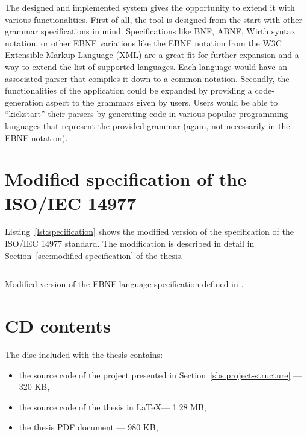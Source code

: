 \documentclass[english,bachelors,forcepolishlogotype]{wizthesis}
\begin{document}
The designed and implemented system gives the opportunity to extend it with
various functionalities. First of all, the tool is designed from the start with
other grammar specifications in mind. Specifications like BNF, ABNF, Wirth
syntax notation, or other EBNF variations like the EBNF notation from the W3C
Extensible Markup Language (XML) are a great fit for further expansion and a way
to extend the list of supported languages. Each language would have an
associated parser that compiles it down to a common notation. Secondly, the
functionalities of the application could be expanded by providing a
code-generation aspect to the grammars given by users. Users would be able to
``kickstart'' their parsers by generating code in various popular programming
languages that represent the provided grammar (again, not necessarily in the
EBNF notation).



\listoffigures

\listoftables

\listoflistings

\begin{appendices}

\chapter{Modified specification of the ISO/IEC 14977} \label{ch:modified-spec}

Listing~\ref{lst:specification} shows the modified version of the specification
of the ISO/IEC 14977 standard. The modification is described in detail in
Section~\ref{sec:modified-specification} of the thesis.

\begin{listing}[H]
  \inputminted[fontsize=\small,frame=lines,breaklines,linenos]
    {lexers/ebnf_lexer.py:EbnfLexer -x}{listings/specification.ebnf}
  \caption{Modified version of the EBNF language specification defined in
  \cite{iso-14977}.}
  \label{lst:specification}
\end{listing}

\chapter{CD contents}

\noindent The disc included with the thesis contains:
\begin{itemize}
  \item the source code of the project presented in
  Section~\ref{sbs:project-structure} --- 320 KB,
  \item the source code of the thesis in \LaTeX --- 1.28 MB,
  \item the thesis PDF document --- 980 KB,
\end{itemize}

\end{appendices}
\end{document}
